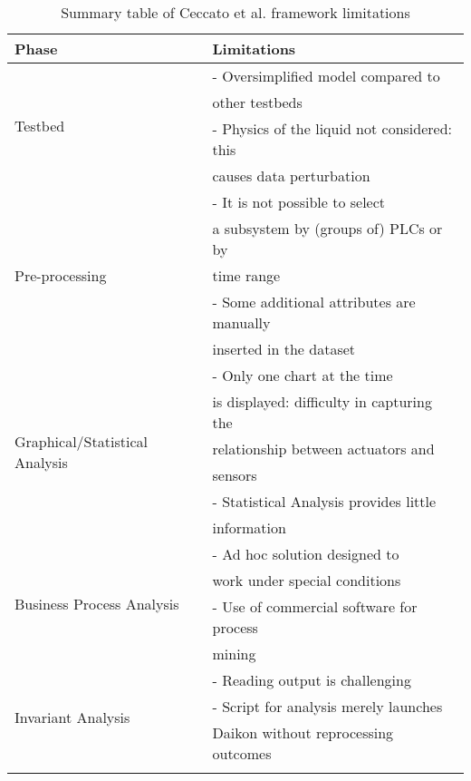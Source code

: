 {\small
\begin{longtable}[c]{p{} p{}}
	\hline
	\textbf{Phase} & \textbf{Limitations} \\ [0.5ex] 
	\hline
	\multirow{4}{12em}{Testbed} & - Oversimplified model compared to \\
	& other testbeds \\
	& - Physics of the liquid not considered: this \\ 
	& causes data perturbation \\
	\hline
	\multirow{5}{12em}{Pre-processing} & - It is not possible to select \\
	& a subsystem by (groups of) PLCs or by \\
	& time range \\
	& - Some additional attributes are manually \\
	& inserted in the dataset \\
	\hline 
	\multirow{6}{12em}{Graphical/Statistical Analysis} & - Only one chart at the time \\
	& is displayed: difficulty in capturing  the \\ 
	& relationship between actuators and \\
	& sensors \\
	& - Statistical Analysis provides little \\ 
	& information \\
	\hline
	\multirow{4}{12em}{Business Process Analysis} & - Ad hoc solution designed to \\
	& work under special conditions \\
	& - Use of commercial software for process \\
	& mining \\
	\hline
	\multirow{3}{12em}{Invariant Analysis} & - Reading output is challenging  \\
	& - Script for analysis merely launches \\
	& Daikon without reprocessing outcomes \\
	\hline
	
	\caption{Summary table of Ceccato et al. framework limitations}
	\label{table:3_ceccato_limitations_table}
\end{longtable}
}
\vfill
\nolinenumbers
